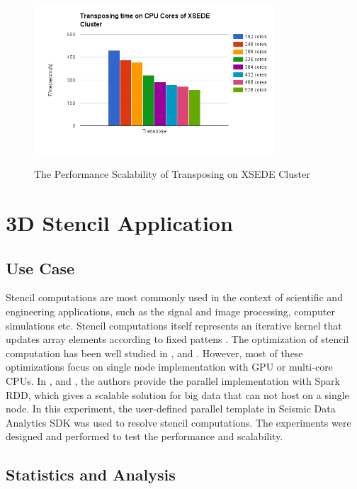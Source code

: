 \begin{figure}[h]
\centering
\includegraphics[width=0.8\textwidth]{figures/XSEDETest.png}\\
\caption{The Performance Scalability of Transposing on XSEDE Cluster }\label{XSEDETest}
\end{figure}


\section{3D Stencil Application}

\subsection{Use Case}

Stencil computations are most commonly used in the context of scientific and engineering applications, such as the signal and image processing, computer simulations etc.
Stencil computations itself represents an iterative kernel that updates array elements according to fixed pattens \cite{StencilWiki}. The optimization of stencil computation has been well studied in \cite{Han2011PADS},\cite{Nguyen2010Blocking} and \cite{Datta2008Stencil}. 
However, most of these optimizations focus on single node implementation with GPU or multi-core CPUs. In \cite{YanMasterThesis}, \cite{7363985} and \cite{7396203}, the authors provide the parallel implementation with Spark RDD, which gives a scalable solution for big data that can not host on a single node. 
In this experiment, the user-defined parallel template in Seismic Data Analytics SDK was used to resolve stencil computations. The experiments were designed and performed to test the performance and scalability.

\subsection{Statistics and Analysis}

